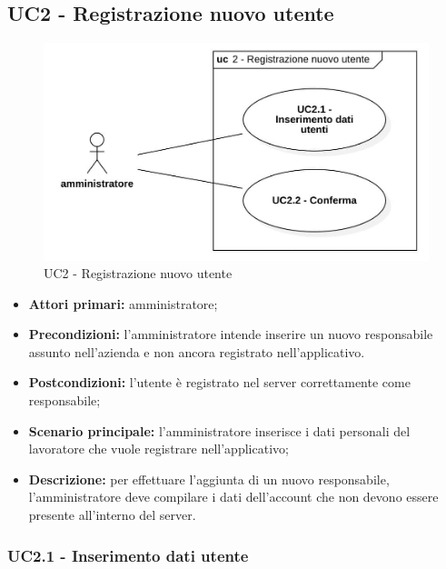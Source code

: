 \subsection{UC2 - Registrazione nuovo utente}

\begin{figure}[H]
	\centering
	\includegraphics[scale=0.55]{res/images/uc2.png}
	\caption{UC2 - Registrazione nuovo utente}
\end{figure}
\begin{itemize}
	\item 	\textbf{Attori primari:} amministratore;
	\item 	\textbf{Precondizioni:}	l'amministratore intende inserire un nuovo responsabile assunto nell'azienda e non ancora registrato nell'applicativo.
	\item 	\textbf{Postcondizioni:} l'utente è registrato nel server correttamente come responsabile;
	\item 	\textbf{Scenario principale:} l'amministratore inserisce i dati personali del lavoratore che vuole registrare nell'applicativo;
	\item 	\textbf{Descrizione:} per effettuare l'aggiunta di un nuovo responsabile, l'amministratore deve compilare i dati dell'account che non devono essere presente all'interno del server.

\end{itemize}

\subsubsection{UC2.1 - Inserimento dati utente}

